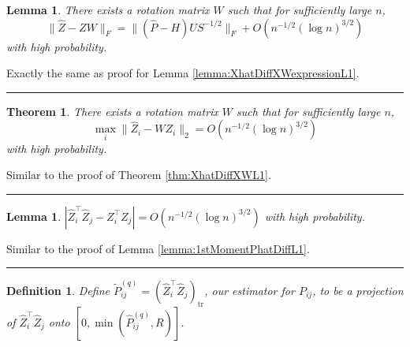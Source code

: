 \documentclass[a4paper]{article}
\newenvironment{proof}{{\bf Proof:  }}{\hfill\rule{2mm}{2mm}}
\newtheorem{lemma}[fact]{Lemma}
\newtheorem{theorem}[fact]{Theorem}
\newtheorem{definition}[fact]{Definition}
\renewcommand{\hat}{\widehat}
\begin{document}
\begin{lemma}
\label{lemma:XhatDiffXWexpression}
There exists a rotation matrix $W$ such that for sufficiently large $n$,
\[
	\|\hat{Z} - Z W\|_F = \| (\hat{P} - H) U S^{-1/2} \|_F + O(n^{-1/2} (\log n)^{3/2})
\]
with high probability.
\end{lemma}
\begin{proof}
Exactly the same as proof for Lemma \ref{lemma:XhatDiffXWexpressionL1}.
\end{proof}

\begin{theorem}
\label{thm:XhatDiffXW}
There exists a rotation matrix $W$ such that for sufficiently large $n$,
\[
	\max_i \| \hat{Z}_i - W Z_i \|_2 = O(n^{-1/2} (\log n)^{3/2})
\]
with high probability.
\end{theorem}
\begin{proof}
Similar to the proof of Theorem \ref{thm:XhatDiffXWL1}.
\end{proof}

\begin{lemma}
\label{lemma:1stMomentPhatDiffLq}
$\left|  \hat{Z}_i^{\top} \hat{Z}_j - Z_i^{\top} Z_j \right| = O(n^{-1/2} (\log n)^{3/2})$ with high probability.
\end{lemma}
\begin{proof}
Similar to the proof of Lemma \ref{lemma:1stMomentPhatDiffL1}.
\end{proof}

\begin{definition}
Define $\widetilde{P}_{ij}^{(q)} = (\hat{Z}_i^{\top} \hat{Z}_j)_{\mathrm{tr}}$, our estimator for $P_{ij}$, to be a projection of $\hat{Z}_i^{\top} \hat{Z}_j$ onto $[0, \min(\hat{P}_{ij}^{(q)}, R)]$.
\end{definition}
\end{document}
